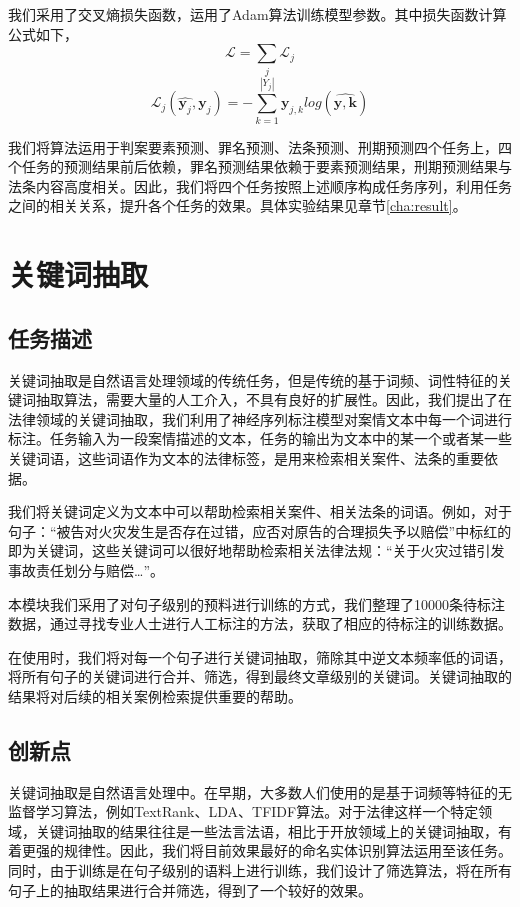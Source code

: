 我们采用了交叉熵损失函数，运用了Adam算法训练模型参数。其中损失函数计算公式如下，
\begin{equation}
	\mathcal{L} = \sum_{j}\mathcal{L}_{j}
\end{equation}
\begin{equation}
	\mathcal{L}_{j}(\hat{\mathbf{y}_{j}}, \mathbf{y}_{j}) = -\sum_{k=1}^{|Y_{j}|}\mathbf{y}_{j, k}log(\hat{\mathbf{y, k}})
\end{equation}

我们将算法运用于判案要素预测、罪名预测、法条预测、刑期预测四个任务上，四个任务的预测结果前后依赖，罪名预测结果依赖于要素预测结果，刑期预测结果与法条内容高度相关。因此，我们将四个任务按照上述顺序构成任务序列，利用任务之间的相关关系，提升各个任务的效果。具体实验结果见章节\ref{cha:result}。


\section{关键词抽取}
\subsection{任务描述}
关键词抽取是自然语言处理领域的传统任务，但是传统的基于词频、词性特征的关键词抽取算法，需要大量的人工介入，不具有良好的扩展性。因此，我们提出了在法律领域的关键词抽取，我们利用了神经序列标注模型对案情文本中每一个词进行标注。任务输入为一段案情描述的文本，任务的输出为文本中的某一个或者某一些关键词语，这些词语作为文本的法律标签，是用来检索相关案件、法条的重要依据。

我们将关键词定义为文本中可以帮助检索相关案件、相关法条的词语。例如，对于句子：“被告对{\color{red}火灾}发生是否存在{\color{red}过错}，应否对原告的合理损失予以{\color{red}赔偿}”中标红的即为关键词，这些关键词可以很好地帮助检索相关法律法规：“关于{\color{red}火灾过错}引发事故责任划分与{\color{red}赔偿}…”。

本模块我们采用了对句子级别的预料进行训练的方式，我们整理了10000条待标注数据，通过寻找专业人士进行人工标注的方法，获取了相应的待标注的训练数据。

在使用时，我们将对每一个句子进行关键词抽取，筛除其中逆文本频率低的词语，将所有句子的关键词进行合并、筛选，得到最终文章级别的关键词。关键词抽取的结果将对后续的相关案例检索提供重要的帮助。

\subsection{创新点}

关键词抽取是自然语言处理中。在早期，大多数人们使用的是基于词频等特征的无监督学习算法，例如TextRank、LDA、TFIDF算法。对于法律这样一个特定领域，关键词抽取的结果往往是一些法言法语，相比于开放领域上的关键词抽取，有着更强的规律性。因此，我们将目前效果最好的命名实体识别算法运用至该任务。同时，由于训练是在句子级别的语料上进行训练，我们设计了筛选算法，将在所有句子上的抽取结果进行合并筛选，得到了一个较好的效果。

